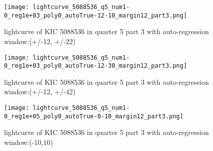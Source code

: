 \documentclass[]{article}
\begin{document}
\begin{figure}[H]
\centering
\texttt{[image: lightcurve\_5088536\_q5\_num1-0\_reg1e+03\_poly0\_autoTrue-12-10\_margin12\_part3.png]}
\caption{lightcurve of KIC 5088536 in quarter 5 part 3 with auto-regression window:(+/-12, +/-22)}
\end{figure}

\begin{figure}[H]
\centering
\texttt{[image: lightcurve\_5088536\_q5\_num1-0\_reg1e+03\_poly0\_autoTrue-12-30\_margin12\_part3.png]}
\caption{lightcurve of KIC 5088536 in quarter 5 part 3 with auto-regression window:(+/-12, +/-42)}
\end{figure}

\begin{figure}[H]
\centering
\texttt{[image: lightcurve\_5088536\_q5\_num1-0\_reg1e+05\_poly0\_autoTrue-0-10\_margin12\_part3.png]}
\caption{lightcurve of KIC 5088536 in quarter 5 part 3 with auto-regression window:(-10,10)}
\end{figure}
\end{document}
